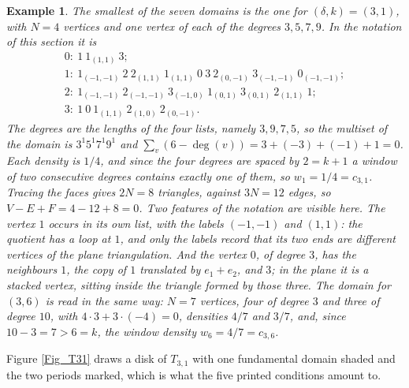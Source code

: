 \documentclass[10pt,a4paper]{article}
\newtheorem{example}[theorem]{Example}
\begin{document}
\begin{example}
\label{Ex_T31}The smallest of the seven domains is the one for $(\delta ,k)=(3,1)$, with $N=4$
vertices and one vertex of each of the degrees $3,5,7,9$. In the notation of this section it is
\[
\begin{array}{l}
0:\ 1\ 1_{(1,1)}\ 3;\\
1:\ 1_{(-1,-1)}\ 2\ 2_{(1,1)}\ 1_{(1,1)}\ 0\ 3\ 2_{(0,-1)}\ 3_{(-1,-1)}\ 0_{(-1,-1)};\\
2:\ 1_{(-1,-1)}\ 2_{(-1,-1)}\ 3_{(-1,0)}\ 1_{(0,1)}\ 3_{(0,1)}\ 2_{(1,1)}\ 1;\\
3:\ 1\ 0\ 1_{(1,1)}\ 2_{(1,0)}\ 2_{(0,-1)}.
\end{array}
\]
The degrees are the lengths of the four lists, namely $3,9,7,5$, so the multiset of the domain is
$3^{1}5^{1}7^{1}9^{1}$ and $\sum_{v}(6-\deg (v))=3+(-3)+(-1)+1=0$. Each density is $1/4$, and since
the four degrees are spaced by $2=k+1$ a window of two consecutive degrees contains exactly one of
them, so $w_{1}=1/4=c_{3,1}$. Tracing the faces gives $2N=8$ triangles, against $3N=12$ edges, so
$V-E+F=4-12+8=0$. Two features of the notation are visible here. The vertex $1$ occurs in its own
list, with the labels $(-1,-1)$ and $(1,1)$: the quotient has a loop at $1$, and only the labels
record that its two ends are different vertices of the plane triangulation. And the vertex $0$, of
degree $3$, has the neighbours $1$, the copy of $1$ translated by $e_{1}+e_{2}$, and $3$; in the
plane it is a stacked vertex, sitting inside the triangle formed by those three. The domain for
$(3,6)$ is read in the same way: $N=7$ vertices, four of degree $3$ and three of degree $10$, with
$4\cdot 3+3\cdot (-4)=0$, densities $4/7$ and $3/7$, and, since $10-3=7>6=k$, the window density
$w_{6}=4/7=c_{3,6}$.
\end{example}

Figure \ref{Fig_T31} draws a disk of $T_{3,1}$ with one fundamental domain shaded and the
two periods marked, which is what the five printed conditions amount to.
\end{document}
